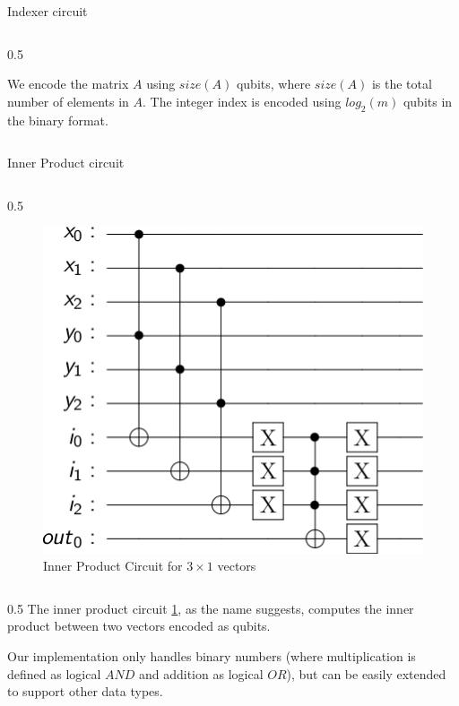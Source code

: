 \documentclass[final]{beamer}
\newlength{\colwidth}
\begin{document}
\begin{frame}[t]
\begin{columns}[t]
\begin{column}{\colwidth}
\begin{block}{Indexer circuit}
\begin{column}{0.5\colwidth}
      \vspace{1em}

      We encode the matrix $A$ using $size(A)$ qubits, where $size(A)$ is the
      total number of elements in $A$.  The integer index is encoded using
      $log_2(m)$ qubits in the binary format.
    \end{column}
  \end{block}

  \begin{block}{Inner Product circuit}
    \begin{column}{0.5\colwidth}
    \begin{figure}
      \centering
      \includegraphics[scale=0.7]{../paper/results/inner_product_3x1.png} 
      \caption{Inner Product Circuit for $3 \times 1$ vectors}
      \label{fig:inner_product_circuit_3x1}
    \end{figure}
    \end{column}
    \begin{column}{0.5\colwidth}
      \vfill
      The inner product circuit \ref{fig:inner_product_circuit_3x1}, as the name
      suggests, computes the inner product between two vectors encoded as
      qubits.
      
      \vspace{1em}

      Our implementation only handles binary numbers (where
      multiplication is defined as logical $AND$ and addition as logical $OR$),
      but can be easily extended to support other data types.
    \end{column}
  \end{block}


\end{column}
\end{columns}
\end{frame}
\end{document}
